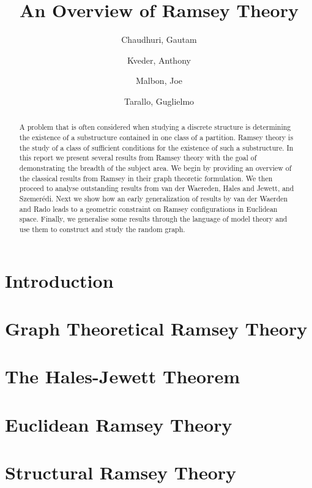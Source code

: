 \documentclass{article}
\title{An Overview of Ramsey Theory}
\author{
  Chaudhuri, Gautam\\
  \and
  Kveder, Anthony\\
  \and
  Malbon, Joe\\
  \and
  Tarallo, Guglielmo\\
}
\theoremstyle{BreakBold}
\theoremstyle{example}
\begin{document}
\begin{titlingpage}
\maketitle
\begin{abstract}
  A problem that is often considered when studying a discrete structure is
  determining the existence of a substructure contained in one class of a partition.
  Ramsey theory is the study of a class of sufficient conditions for the
  existence of such a substructure.
  In this report we present several results from Ramsey theory with the goal of
  demonstrating the breadth of the subject area.
  We begin by providing an overview of the classical results from Ramsey in
  their graph theoretic formulation.
  We then proceed to analyse outstanding results from van der Waereden, Hales
  and Jewett, and Szemerédi.
  Next we show how an early generalization of results by van der Waerden and
  Rado leads to a geometric constraint on Ramsey configurations in Euclidean
  space.
  Finally, we generalise some results through the language of model theory and
  use them to construct and study the random graph.
\end{abstract}
\tableofcontents
  
\end{titlingpage}

\section*{Introduction}
\label{sec:0}


\section{Graph Theoretical Ramsey Theory}
\label{sec:1}


\section{The Hales-Jewett Theorem}
\label{sec:2}

\newpage
\section{Euclidean Ramsey Theory}
\label{sec:3}


\newpage
\section{Structural Ramsey Theory}
\label{sec:4}


\printbibliography
\end{document}
